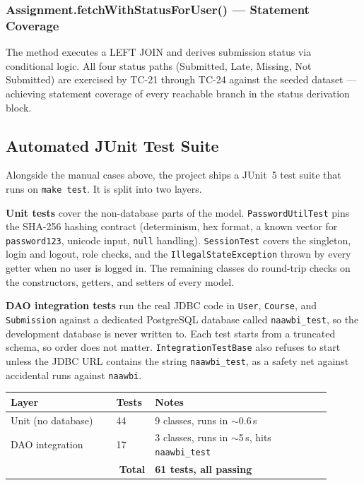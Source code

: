 \documentclass[12pt, a4paper]{article}
\newcommand{\fcolplain}[1]{\textbf{#1}}
\begin{document}
\subsubsection*{Assignment.fetchWithStatusForUser() --- Statement Coverage}
The method executes a LEFT JOIN and derives submission status via conditional
logic. All four status paths (Submitted, Late, Missing, Not Submitted) are
exercised by TC-21 through TC-24 against the seeded dataset --- achieving
statement coverage of every reachable branch in the status derivation block.

\subsection{Automated JUnit Test Suite}

Alongside the manual cases above, the project ships a JUnit~5 test suite
that runs on \texttt{make test}. It is split into two layers.

\textbf{Unit tests} cover the non-database parts of the model.
\texttt{PasswordUtilTest} pins the SHA-256 hashing contract (determinism,
hex format, a known vector for \texttt{password123}, unicode input,
\texttt{null} handling). \texttt{SessionTest} covers the singleton,
login and logout, role checks, and the \texttt{IllegalStateException}
thrown by every getter when no user is logged in. The remaining classes
do round-trip checks on the constructors, getters, and setters of every
model.

\textbf{DAO integration tests} run the real JDBC code in \texttt{User},
\texttt{Course}, and \texttt{Submission} against a dedicated PostgreSQL
database called \texttt{naawbi\_test}, so the development database is
never written to. Each test starts from a truncated schema, so order
does not matter. \texttt{IntegrationTestBase} also refuses to start
unless the JDBC URL contains the string \texttt{naawbi\_test}, as a
safety net against accidental runs against \texttt{naawbi}.

\begin{center}
\small\begin{tabular}{@{}p{0.30\linewidth}p{0.10\linewidth}p{0.50\linewidth}@{}}
  \toprule
  \fcolplain{Layer} & Tests & Notes \\
  \midrule
  Unit (no database)        & 44 & 9 classes, runs in $\sim$0.6\,s \\
  DAO integration           & 17 & 3 classes, runs in $\sim$5\,s, hits \texttt{naawbi\_test} \\
  \midrule
  \multicolumn{2}{r}{\textbf{Total}} & \textbf{61 tests, all passing} \\
  \bottomrule
\end{tabular}
\end{center}
\end{document}
